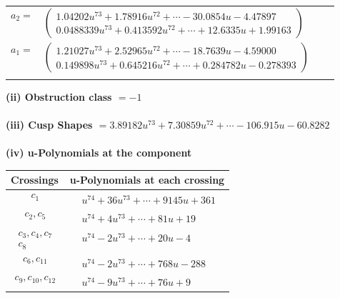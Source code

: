 \documentclass[1p]{elsarticle_modified}
\theoremstyle{definition}
\begin{document}
\begin{tabular}{m{7pt} m{180pt} m{7pt} m{180pt} }
\flushright $a_{2}=$&$\begin{pmatrix}1.04202 u^{73}+1.78916 u^{72}+\cdots-30.0854 u-4.47897\\0.0488339 u^{73}+0.413592 u^{72}+\cdots+12.6335 u+1.99163\end{pmatrix}$ \\
\flushright $a_{1}=$&$\begin{pmatrix}1.21027 u^{73}+2.52965 u^{72}+\cdots-18.7639 u-4.59000\\0.149898 u^{73}+0.645216 u^{72}+\cdots+0.284782 u-0.278393\end{pmatrix}$\\&\end{tabular}
\flushleft \textbf{(ii) Obstruction class $= -1$}\\~\\
\flushleft \textbf{(iii) Cusp Shapes $= 3.89182 u^{73}+7.30859 u^{72}+\cdots-106.915 u-60.8282$}\\~\\
\newpage\renewcommand{\arraystretch}{1}
\flushleft \textbf{(iv) u-Polynomials at the component}\newline \\
\begin{tabular}{m{50pt}|m{274pt}}
Crossings & \hspace{64pt}u-Polynomials at each crossing \\
\hline $$\begin{aligned}c_{1}\end{aligned}$$&$\begin{aligned}
&u^{74}+36 u^{73}+\cdots+9145 u+361
\end{aligned}$\\
\hline $$\begin{aligned}c_{2},c_{5}\end{aligned}$$&$\begin{aligned}
&u^{74}+4 u^{73}+\cdots+81 u+19
\end{aligned}$\\
\hline $$\begin{aligned}c_{3},c_{4},c_{7}\\c_{8}\end{aligned}$$&$\begin{aligned}
&u^{74}-2 u^{73}+\cdots+20 u-4
\end{aligned}$\\
\hline $$\begin{aligned}c_{6},c_{11}\end{aligned}$$&$\begin{aligned}
&u^{74}-2 u^{73}+\cdots+768 u-288
\end{aligned}$\\
\hline $$\begin{aligned}c_{9},c_{10},c_{12}\end{aligned}$$&$\begin{aligned}
&u^{74}-9 u^{73}+\cdots+76 u+9
\end{aligned}$\\
\hline
\end{tabular}\\~\\
\end{document}
